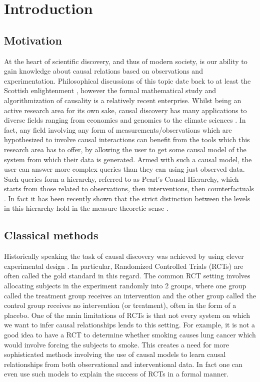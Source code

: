 \documentclass{tufte-book}
\begin{document}
\setcounter{tocdepth}{1}
\tableofcontents


\chapter{Introduction}
\label{sec:org8b2222f}
\label{sec:Intro}
\section{Motivation}
\label{sec:orgf89ec47}
At the heart of scientific discovery, and thus of modern society, is our ability to gain knowledge about causal relations based on observations and experimentation. Philosophical discussions of this topic date back to at least the Scottish enlightenment \cite{hume-1748-enquir-concer}, however the formal mathematical study and algorithmization of causality is a relatively recent enterprise. Whilst being an active research area for its own sake, causal discovery has many applications to diverse fields ranging from economics \cite{huenermund-2019-causal-infer} and genomics \cite{hu-2018-applic-causal} to the climate sciences \cite{runge-2019-infer-causat}. In fact, any field involving any form of measurements/observations which are hypothesized to involve causal interactions can benefit from the tools which this research area has to offer, by allowing the user to get some causal model of the system from which their data is generated. Armed with such a causal model, the user can answer more complex queries than they can using just observed data. Such queries form a hierarchy, referred to as Pearl's Causal Hierarchy, which starts from those related to observations, then interventions, then counterfactuals \cite{pearl-2018-book-why}.   In fact it has been recently shown that the strict distinction between the levels in this hierarchy hold in the measure theoretic sense \cite{elias-2020-pearl-hierar}.

\section{Classical methods}
\label{sec:org33a64b0}
Historically speaking the task of causal discovery was achieved by using clever experimental design \cite{fisher-1935}. In particular, Randomized Controlled Trials (RCTs) are often called the gold standard in this regard. The common RCT setting involves allocating subjects in the experiment randomly into 2 groups, where one group called the treatment group receives an intervention and the other group called the control group receives no intervention (or treatment), often in the form of a placebo. One of the main limitations of RCTs is that not every system on which we want to infer causal relationships lends to this setting. For example, it is not a good idea to have a RCT to determine whether smoking causes lung cancer which would involve forcing the subjects to smoke. This creates a need for more sophisticated methods involving the use of causal models to learn causal relationships from both observational and interventional data. In fact one can even use such models to explain the success of RCTs in a formal manner.
\end{document}
